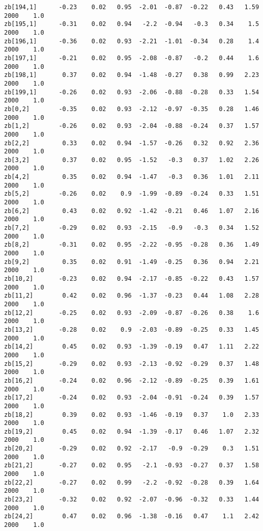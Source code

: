 \documentclass[11pt]{article}
\begin{document}
\begin{Verbatim}[commandchars=\\\{\}]
zb[194,1]      -0.23    0.02   0.95  -2.01  -0.87  -0.22   0.43   1.59   2000    1.0
zb[195,1]      -0.31    0.02   0.94   -2.2  -0.94   -0.3   0.34    1.5   2000    1.0
zb[196,1]      -0.36    0.02   0.93  -2.21  -1.01  -0.34   0.28    1.4   2000    1.0
zb[197,1]      -0.21    0.02   0.95  -2.08  -0.87   -0.2   0.44    1.6   2000    1.0
zb[198,1]       0.37    0.02   0.94  -1.48  -0.27   0.38   0.99   2.23   2000    1.0
zb[199,1]      -0.26    0.02   0.93  -2.06  -0.88  -0.28   0.33   1.54   2000    1.0
zb[0,2]        -0.35    0.02   0.93  -2.12  -0.97  -0.35   0.28   1.46   2000    1.0
zb[1,2]        -0.26    0.02   0.93  -2.04  -0.88  -0.24   0.37   1.57   2000    1.0
zb[2,2]         0.33    0.02   0.94  -1.57  -0.26   0.32   0.92   2.36   2000    1.0
zb[3,2]         0.37    0.02   0.95  -1.52   -0.3   0.37   1.02   2.26   2000    1.0
zb[4,2]         0.35    0.02   0.94  -1.47   -0.3   0.36   1.01   2.11   2000    1.0
zb[5,2]        -0.26    0.02    0.9  -1.99  -0.89  -0.24   0.33   1.51   2000    1.0
zb[6,2]         0.43    0.02   0.92  -1.42  -0.21   0.46   1.07   2.16   2000    1.0
zb[7,2]        -0.29    0.02   0.93  -2.15   -0.9   -0.3   0.34   1.52   2000    1.0
zb[8,2]        -0.31    0.02   0.95  -2.22  -0.95  -0.28   0.36   1.49   2000    1.0
zb[9,2]         0.35    0.02   0.91  -1.49  -0.25   0.36   0.94   2.21   2000    1.0
zb[10,2]       -0.23    0.02   0.94  -2.17  -0.85  -0.22   0.43   1.57   2000    1.0
zb[11,2]        0.42    0.02   0.96  -1.37  -0.23   0.44   1.08   2.28   2000    1.0
zb[12,2]       -0.25    0.02   0.93  -2.09  -0.87  -0.26   0.38    1.6   2000    1.0
zb[13,2]       -0.28    0.02    0.9  -2.03  -0.89  -0.25   0.33   1.45   2000    1.0
zb[14,2]        0.45    0.02   0.93  -1.39  -0.19   0.47   1.11   2.22   2000    1.0
zb[15,2]       -0.29    0.02   0.93  -2.13  -0.92  -0.29   0.37   1.48   2000    1.0
zb[16,2]       -0.24    0.02   0.96  -2.12  -0.89  -0.25   0.39   1.61   2000    1.0
zb[17,2]       -0.24    0.02   0.93  -2.04  -0.91  -0.24   0.39   1.57   2000    1.0
zb[18,2]        0.39    0.02   0.93  -1.46  -0.19   0.37    1.0   2.33   2000    1.0
zb[19,2]        0.45    0.02   0.94  -1.39  -0.17   0.46   1.07   2.32   2000    1.0
zb[20,2]       -0.29    0.02   0.92  -2.17   -0.9  -0.29    0.3   1.51   2000    1.0
zb[21,2]       -0.27    0.02   0.95   -2.1  -0.93  -0.27   0.37   1.58   2000    1.0
zb[22,2]       -0.27    0.02   0.99   -2.2  -0.92  -0.28   0.39   1.64   2000    1.0
zb[23,2]       -0.32    0.02   0.92  -2.07  -0.96  -0.32   0.33   1.44   2000    1.0
zb[24,2]        0.47    0.02   0.96  -1.38  -0.16   0.47    1.1   2.42   2000    1.0

\end{Verbatim}
\end{document}
